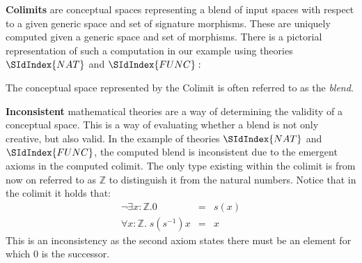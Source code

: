 {\bf Colimits} are conceptual spaces representing a blend of input
spaces with respect to a given generic space and set of signature
morphisms. These are uniquely computed given a generic space and set of
morphisms. There is a pictorial representation of such a computation
in our example using theories $\SIdIndex{NAT}$ and $\SIdIndex{FUNC}:$
\begin{center}
\end{center}
The conceptual space represented by the Colimit is often referred to
as the {\em blend}. 

{\bf Inconsistent} mathematical theories are a way of determining the
validity of a conceptual space. This is a way of evaluating whether a
blend is not only creative, but also valid. In the example of theories
$\SIdIndex{NAT}$ and $\SIdIndex{FUNC}$,
the computed blend is inconsistent due to the emergent axioms in the
computed colimit. The only type existing within the colimit is from now
on referred to as $\mathbb{Z}$ to distinguish it from the natural
numbers. Notice that in the colimit it holds that:
\begin{eqnarray*}
\neg \exists x: \mathbb{Z}. 0 &=&s(x)\\
\forall x:\mathbb{Z}.\;s(s^{-1}) x &=& x
\end{eqnarray*}
This is an inconsistency as the second axiom states there must be an
element for which 0 is the successor.

